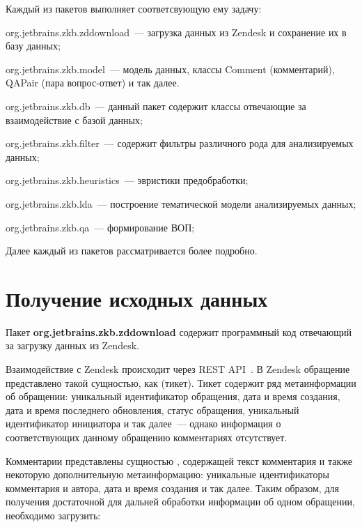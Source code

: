 Каждый из пакетов выполняет соответсвующую ему задачу:

\begin{itemize*}
\item org.jetbrains.zkb.zddownload~--- загрузка данных из Zendesk и сохранение их в базу данных;
\item org.jetbrains.zkb.model~--- модель данных, классы Comment (комментарий), QAPair (пара вопрос-ответ) и так далее.
\item org.jetbrains.zkb.db~--- данный пакет содержит классы отвечающие за взаимодействие с базой данных;
\item org.jetbrains.zkb.filter~--- содержит фильтры различного рода для анализируемых данных;
\item org.jetbrains.zkb.heuristics~--- эвристики предобработки;
\item org.jetbrains.zkb.lda~--- построение тематической модели анализируемых данных;
\item org.jetbrains.zkb.qa~--- формирование ВОП;

\end{itemize*}

Далее каждый из пакетов рассматривается более подробно.

\section{Получение исходных данных}
\label{sec:zddwn}

Пакет \textbf{org.jetbrains.zkb.zddownload} содержит программный код отвечающий за загрузку данных из Zendesk.

Взаимодействие с Zendesk происходит через REST API~\cite{zdapi}. В Zendesk обращение представлено такой сущностью, как  (тикет). Тикет содержит ряд метаинформации об обращении: уникальный идентификатор обращения, дата и время создания, дата и время последнего обновления, статус обращения, уникальный идентификатор инициатора и так далее~--- однако информация о соответствующих данному обращению комментариях отсутствует.


Комментарии представлены сущностью , содержащей текст комментария и также некоторую дополнительную метаинформацию: уникальные идентификаторы комментария и автора, дата и время создания и так далее. Таким образом, для получения достаточной для дальней обработки информации об одном обращении, необходимо загрузить:

